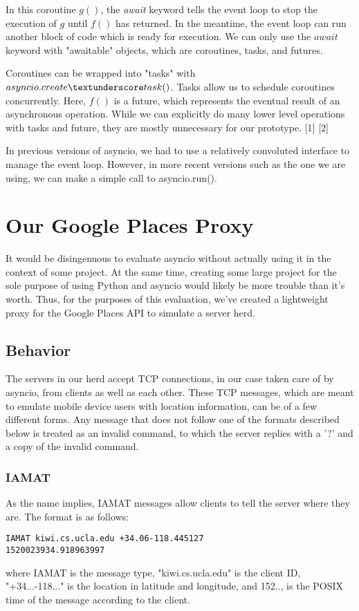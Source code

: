 In this coroutine $g()$, the \emph {await} keyword tells the event loop to stop the execution of $g$ until 
$f()$ has returned. In the meantime, the event loop can run another block of code which is ready for execution. We can 
only use the $await$ keyword with "awaitable" objects, which are coroutines, tasks, and futures. 

Coroutines can be wrapped into "tasks" with 
$asyncio.create\textunderscore task()$. Tasks allow us to schedule coroutines concurrently. Here, $f()$ is a future, which represents the eventual 
result of an asynchronous operation.  While we can explicitly do many lower level operations with tasks and future, they are mostly
unnecessary for our prototype. [1] [2]

In previous versions of asyncio, we had to use a relatively convoluted interface to manage the event loop. However, in more recent versions such as the one we
are using, we can make a simple call to asyncio.run().
\section{Our Google Places Proxy}
It would be disingenuous to evaluate asyncio without actually using it in the context of some project. At the same time, creating some large project 
for the sole purpose of using Python and asyncio would likely be more trouble than it's worth. Thus, for the purposes of this evaluation, we've created a 
lightweight proxy for the Google Places API to simulate a server herd. 
\subsection{Behavior}
The servers in our herd accept TCP connections, in our case taken care of by asyncio, from clients as well as each other. These TCP messages, 
which are meant to emulate mobile device users with location information, can be of a few different forms. Any message that does not follow
one of the formats described below is treated as an invalid command, to which the server replies with a '?' and a copy of the invalid command.
\subsubsection{IAMAT}
As the name implies, IAMAT messages allow clients to tell the server where they are. The format is as follows:
\begin{verbatim}
IAMAT kiwi.cs.ucla.edu +34.06-118.445127 
1520023934.918963997
\end{verbatim}
where IAMAT is the message type, "kiwi.cs.ucla.edu" is the client ID, "+34...-118..." is the location in latitude and longitude,
and 152.., is the POSIX time of the message according to the client. 
